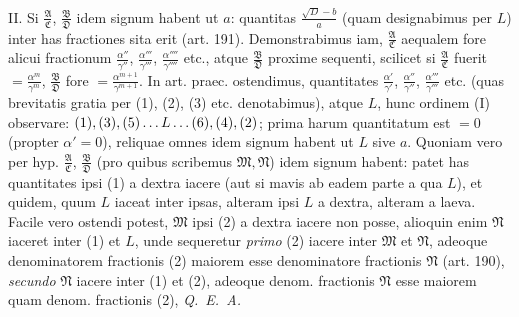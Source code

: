 II. Si $\frac{\mathfrak{A}}{\mathfrak{C}}$, $\frac{\mathfrak{B}}{\mathfrak{D}}$ idem signum habent ut $a$: quantitas $\frac{\surd D-b}{a}$ (quam designabimus per $L$) inter has fractiones sita erit (art. 191). Demonstrabimus iam, $\frac{\mathfrak{A}}{\mathfrak{C}}$ aequalem fore alicui fractionum $\frac{\alpha''}{\gamma''}$, $\frac{\alpha'''}{\gamma'''}$, $\frac{\alpha''''}{\gamma''''}$ etc., atque $\frac{\mathfrak{B}}{\mathfrak{D}}$ proxime sequenti, scilicet si $\frac{\mathfrak{A}}{\mathfrak{C}}$ fuerit $=\frac{\alpha^m}{\gamma^m}$, $\frac{\mathfrak{B}}{\mathfrak{D}}$ fore $=\frac{\alpha^{m+1}}{\gamma^{m+1}}$. In art. praec. ostendimus, quantitates $\frac{\alpha'}{\gamma'}$, $\frac{\alpha''}{\gamma''}$, $\frac{\alpha'''}{\gamma'''}$ etc. (quas brevitatis gratia per (1), (2), (3) etc. denotabimus), atque $L$, hunc ordinem (I) observare: $(1),(3),(5)\mathinner{\ldotp\ldotp\ldotp} L\mathinner{\ldotp\ldotp\ldotp}(6),(4),(2)$; prima harum quantitatum est $=0$ (propter $\alpha'=0$), reliquae omnes idem signum habent ut $L$ sive $a$. Quoniam vero per hyp. $\frac{\mathfrak{A}}{\mathfrak{C}}$, $\frac{\mathfrak{B}}{\mathfrak{D}}$ (pro quibus scribemus $\mathfrak{M},\mathfrak{N}$) idem signum habent: patet has quantitates ipsi (1) a dextra iacere (aut si mavis ab eadem parte a qua $L$), et quidem, quum $L$ iaceat inter ipsas, alteram ipsi $L$ a dextra, alteram a laeva. Facile vero ostendi potest, $\mathfrak{M}$ ipsi (2) a dextra iacere non posse, alioquin enim $\mathfrak{N}$ iaceret inter (1) et $L$, unde sequeretur \textit{primo} (2) iacere inter $\mathfrak{M}$ et $\mathfrak{N}$, adeoque denominatorem fractionis (2) maiorem esse denominatore fractionis $\mathfrak{N}$ (art. 190), \textit{secundo} $\mathfrak{N}$ iacere inter (1) et (2), adeoque denom. fractionis $\mathfrak{N}$ esse maiorem quam denom. fractionis (2), \textit{Q. E. A.}

